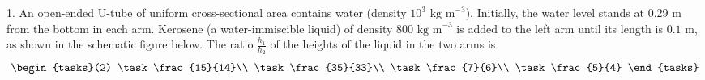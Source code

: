  1. An open-ended U-tube of uniform cross-sectional area contains water (density \(10^3\text{ kg m}^{-3}\)). Initially, the water level stands at \(0.29\text{ m}\) from the bottom in each arm. Kerosene (a water-immiscible liquid) of density \(800\text{ kg m}^{-3}\) is added to the left arm until its length is \(0.1\text{ m}\), as shown in the schematic figure below. The ratio \(\frac{h_1}{h_2}\) of the heights of the liquid in the two arms is
$$\begin{tasks}(2)
\task \frac{15}{14}\\
\task \frac{35}{33}\\
\task \frac{7}{6}\\
\task \frac{5}{4}
\end{tasks}$$